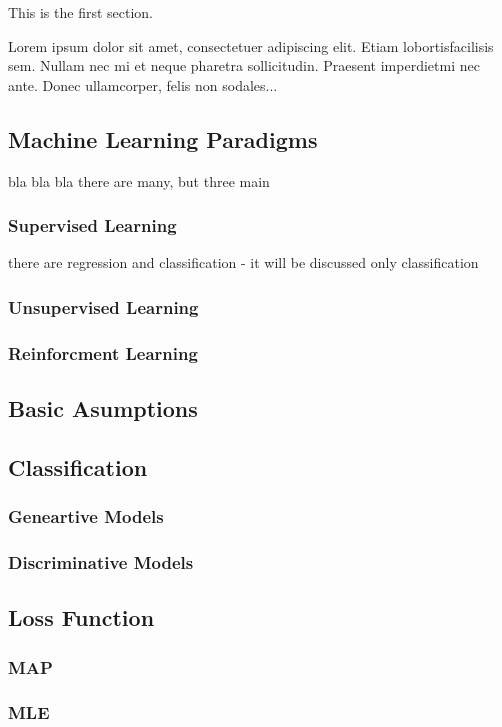 \documentclass[12pt]{article}
\begin{document}
This is the first section.

Lorem  ipsum  dolor  sit  amet,  consectetuer  adipiscing  
elit.   Etiam  lobortisfacilisis sem.  Nullam nec mi et 
neque pharetra sollicitudin.  Praesent imperdietmi nec ante. 
Donec ullamcorper, felis non sodales...



\subsection{Machine Learning Paradigms}
bla bla bla there are many, but three main

\subsubsection{Supervised Learning}
there are regression and classification - it will be discussed only classification
\subsubsection{Unsupervised Learning}
\subsubsection{Reinforcment Learning}

\subsection{Basic Asumptions}
\subsection{Classification}
\subsubsection{Geneartive Models}
\subsubsection{Discriminative Models}
\subsection{Loss Function}
\subsubsection{MAP}
\subsubsection{MLE}
\end{document}
